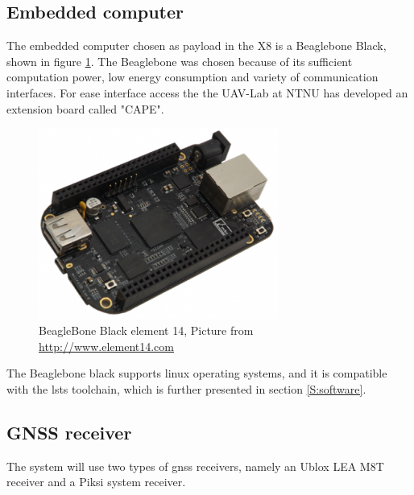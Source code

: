 \subsection{Embedded computer}
The embedded computer chosen as payload in the X8 is a Beaglebone Black, shown in figure \ref{figure:BeagleBone}. The Beaglebone was chosen because of its sufficient computation power, low energy consumption and variety of communication interfaces. For ease interface access the  the UAV-Lab at NTNU has developed an extension board called "CAPE"\citep{KlausenX8}.
\begin{figure}[H]
	\centering
		\includegraphics[width=0.7\textwidth]{figs/BeagleBoneBlackE14.png}
		\caption{BeagleBone Black element 14, Picture from \url{http://www.element14.com}}
		\label{figure:BeagleBone}
\end{figure}
The Beaglebone black supports linux operating systems, and it is compatible with the \gls{lsts} toolchain, which is further presented in section \ref{S:software}.
\subsection{GNSS receiver}
The system will use two types of \gls{gnss} receivers, namely an Ublox LEA M8T receiver and a Piksi system receiver. 

